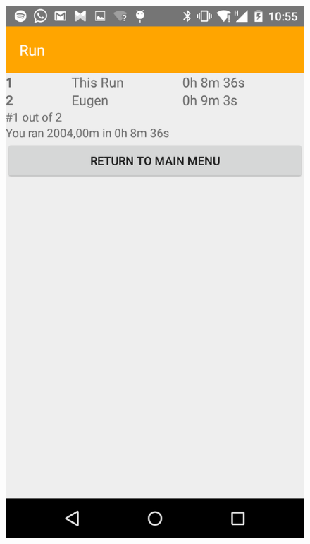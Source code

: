 \begin{figure}
\centering
\begin{minipage}{.4\textwidth}
  \centering
  \includegraphics[width=.8\linewidth]{abb/bsp/bsp21}
  \label{fig:bsp21}
\end{minipage}
\begin{minipage}{.4\textwidth}
  \centering

\end{minipage}
\end{figure}
